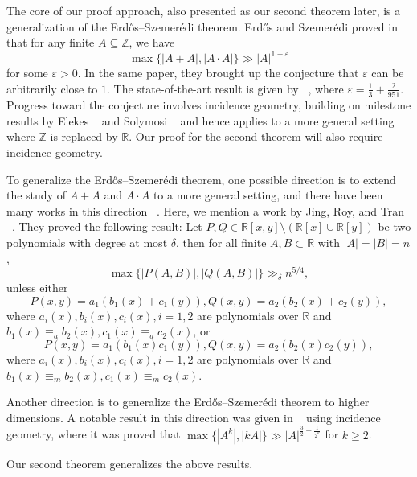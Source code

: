 \documentclass[12pt,reqno]{amsart}
\numberwithin{equation}{section}
\begin{document}
The core of our proof approach, also presented as our second theorem later, is a generalization of the Erd\H{o}s--Szemerédi theorem. Erd\H{o}s and Szemer\'{e}di proved in ~\cite{erdos1983sums} that for any finite $A\subseteq \mathbb{Z}$, we have
\[
\max\{|A+A|,|A\cdot A|\}\gg |A|^{1+\varepsilon}
\]
for some $\varepsilon >0$. In the same paper, they brought up the conjecture that $\varepsilon$ can be arbitrarily close to $1$.   The state-of-the-art result is given by ~\cite{bloom2025control}, where $\varepsilon = \frac{1}{3} + \frac{2}{951}$. Progress toward the conjecture involves incidence geometry, building on milestone results by Elekes ~\cite{elekes1997number} and Solymosi ~\cite{solymosi2009bounding} and hence applies to a more general setting where $\mathbb{Z}$ is replaced by $\mathbb{R}$. Our proof for the second theorem will also require incidence geometry.


To generalize the Erd\H{o}s--Szemerédi theorem, one possible direction is to extend the study of $A+A$ and $A\cdot A$ to a more general setting, and there have been many works in this direction ~\cite{elekes2000combinatorial,shen2012algebraic,solymosi2009incidences}. Here, we mention a work by Jing, Roy, and Tran ~\cite{jing2022semialgebraic}. They proved the following result: Let $P,Q\in \mathbb{R}[x,y]\setminus (\mathbb{R}[x]\cup \mathbb{R}[y])$ be two polynomials with degree at most $\delta $, then for all finite $A,B\subset\mathbb{R}$ with $|A|=|B|=n$, \[\max\{|P(A,B)|,|Q(A,B)|\}\gg_{\delta} n^{5/4},\] unless either $$P(x,y)=a_{1}(b_{1}(x)+c_{1}(y)), Q(x,y)=a_{2}(b_{2}(x)+c_{2}(y)),$$ where $a_{i}(x),b_{i}(x),c_{i}(x),i=1,2$ are polynomials over $\mathbb{R}$ and $b_{1}(x)\equiv_{a}b_{2}(x), c_{1}(x)\equiv_{a}c_{2}(x)$, or $$P(x,y)=a_{1}(b_{1}(x)c_{1}(y)), Q(x,y)=a_{2}(b_{2}(x)c_{2}(y)),$$ where $a_{i}(x),b_{i}(x),c_{i}(x),i=1,2$ are polynomials over $\mathbb{R}$ and $b_{1}(x)\equiv_{m}b_{2}(x), c_{1}(x)\equiv_{m}c_{2}(x)$. 
\par Another direction is to generalize the Erd\H{o}s--Szemerédi theorem to higher dimensions. A notable result in this direction was given in ~\cite{elekes2000convexity} using incidence geometry, where it was proved that $\max\{|A^k|,|kA|\}\gg |A|^{\frac{3}{2}-\frac{1}{2^k}}$ for $k\ge 2$. 

Our second theorem generalizes the above results.
\end{document}

